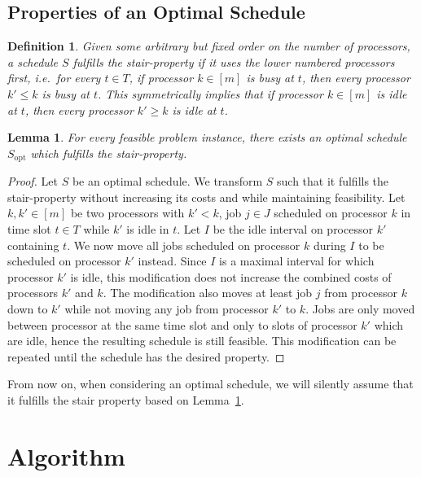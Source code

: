 \documentclass[a4paper]{article}
\DeclareMathOperator{\opt}{opt}
\newtheorem{lemma}[theorem]{Lemma}
\newtheorem{definition}[theorem]{Definition}
\begin{document}
\subsection{Properties of an Optimal Schedule}
\begin{definition}\label{def:stair_property}
  Given some arbitrary but fixed order on the number of processors, a schedule $S$ fulfills the \emph{stair-property} if it uses the lower numbered processors first, i.e.\ for every $t \in T$, if processor $k \in [m]$ is busy at $t$, then every processor $k' \leq k$ is busy at $t$.
  This symmetrically implies that if processor $k \in [m]$ is idle at $t$, then every processor $k' \geq k$ is idle at $t$.
\end{definition}

\begin{lemma}\label{lemma:stair_property_opt}
  For every feasible problem instance, there exists an optimal schedule $S_{\opt}$ which fulfills the stair-property.
\end{lemma}
\begin{proof}
  Let $S$ be an optimal schedule.
  We transform $S$ such that it fulfills the stair-property without increasing its costs and while maintaining feasibility.
  Let $k, k' \in [m]$ be two processors with $k' < k$, job $j \in J$ scheduled on processor $k$ in time slot $t \in T$ while $k'$ is idle in $t$.
  Let $I$ be the idle interval on processor $k'$ containing $t$.
  We now move all jobs scheduled on processor $k$ during $I$ to be scheduled on processor $k'$ instead.
  Since $I$ is a maximal interval for which processor $k'$ is idle, this modification does not increase the combined costs of processors $k'$ and $k$.
  The modification also moves at least job $j$ from processor $k$ down to $k'$ while not moving any job from processor $k'$ to $k$.
  Jobs are only moved between processor at the same time slot and only to slots of processor $k'$ which are idle, hence the resulting schedule is still feasible.
  This modification can be repeated until the schedule has the desired property.
\end{proof}
From now on, when considering an optimal schedule, we will silently assume that it fulfills the stair property based on Lemma~\ref{lemma:stair_property_opt}.

\section{Algorithm}
\end{document}
